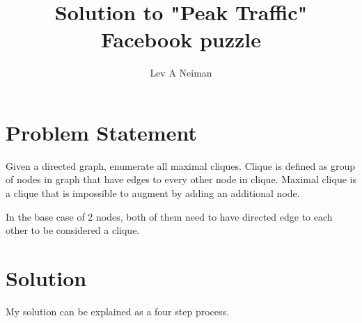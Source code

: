 \documentclass[11pt]{article}
\begin{document}
\title{Solution to "Peak Traffic" Facebook puzzle\cite{peaktraffic}}
\author{Lev A Neiman}

\maketitle

\section{Problem Statement}

Given a directed graph, enumerate all maximal cliques.  Clique is defined as group of nodes in graph that have edges to every other node in clique.  Maximal clique is a clique that is impossible to augment by adding an additional node.

In the base case of 2 nodes, both of them need to have directed edge to each other to be considered a clique.

\section{Solution}

My solution can be explained as a four step process.
\end{document}
